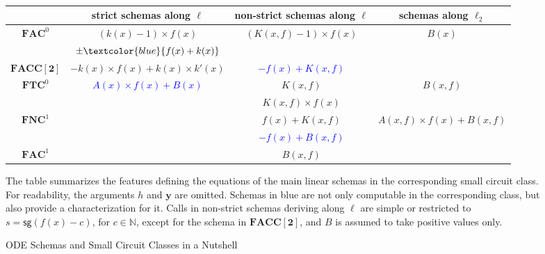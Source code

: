 \documentclass[11pt, oneside]{article}
\newcommand{\longv}[1]{}
\newcommand{\fun}[1]{\mathsf{#1}}
\newcommand{\Nat}{\mathbb{N}}
\newcommand{\NC}{\mathbf{FNC}}
\newcommand{\AC}{\mathbf{FAC}}
\newcommand{\TC}{\mathbf{FTC}}
\newcommand{\FACC}{\mathbf{FACC[2]}}
\newcommand{\tu}[1]{\mathbf{#1}}
\theoremstyle{definition}
\begin{document}
\begin{figure}\
\caption{ODE Schemas and Small Circuit Classes in a Nutshell}\label{fig}
\centering
\begin{center}
\begin{tabular}{c || c | c | c }
& strict schemas along $\ell$ & non-strict schemas along $\ell$ & schemas along $\ell_2$ \\
\hline
\hline
$\AC^0$ &
 $(k(x)-1) \times f(x)$ 
 & $(K(x,f)-1) \times f(x)$ 
 & $B(x)$  \\
  &
 $\pm \textcolor{blue}{f(x) + k(x)}$ 
 &  
 &  \\ 
 \hline
 $\FACC$ &
  $ -k(x) \times f(x) + k(x) \times k'(x)$
  & \textcolor{blue}{$-f(x) + K(x,f)$}  &  \\  
%  
  \hline
 $\TC^0$ & \textcolor{blue}{$A(x)\times f(x)+B(x)$} & $K(x,f)$ & $B(x,f)$  \\
 & & $K(x,f) \times f(x)$ & \\ \hline
 $\NC^1$ & & $f(x) + K(x,f)$ & $A(x,f) \times f(x) + B(x,f)$\\
 & & \textcolor{blue}{$-f(x) + B(x,f)$} & \\
 \hline
 $\AC^1$ & & $B(x,f)$ & \\
\end{tabular}
\end{center}
\footnotesize
\raggedright
The table summarizes the features defining the equations of the main linear schemas in the corresponding small circuit class.
%
For readability, the arguments $h $ and $\tu y$ are omitted. 
Schemas in blue are not only computable in the corresponding class, but also provide a characterization for it.
%
Calls in non-strict schemas deriving along $\ell$ are simple or restricted to $s=\fun{sg}(f(x)-c)$, for $c\in \Nat$, except for the schema in $\FACC$, and $B$ is assumed to take positive values only.
\end{figure}
\normalsize
\end{document}
